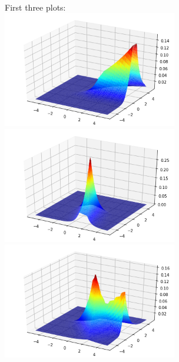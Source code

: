 \documentclass[a4paper]{article}
\theoremstyle{definition}
\newenvironment{soln}{
    \leavevmode\color{blue}\ignorespaces
}{}
\begin{document}
\begin{enumerate}
\begin{soln}
\\\\\\\\\\\\First three plots:\\
\includegraphics[width=3in]{1.png}
\includegraphics[width=3in]{2.png}\\
\includegraphics[width=3in]{0.png}\\


\end{soln}
\end{enumerate}
\end{document}
